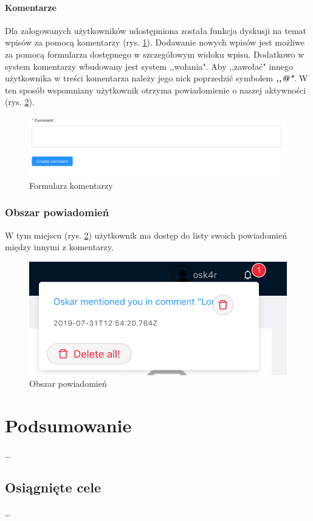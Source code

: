 \documentclass[declaration,shortabstract]{iithesis}
\begin{document}
\subsubsection{Komentarze}
Dla zalogowanych użytkowników udostępniona została funkcja dyskusji na temat wpisów za pomocą komentarzy (rys. \ref{fig:comment}). Dodawanie nowych wpisów jest możliwe za pomocą formularza dostępnego w szczegółowym widoku wpisu. Dodatkowo w system komentarzy wbudowany jest system ,,wołania". Aby ,,zawołać" innego użytkownika w treści komentarza należy jego nick poprzedzić symbolem \textbf{\textit{,,@"}}. W ten sposób wspomniany użytkownik otrzyma powiadomienie o naszej aktywności (rys. \ref{fig:notification}).

\begin{figure}
    \centering
    \includegraphics[width=\linewidth]{images/komentarz.png}
    \caption{Formularz komentarzy}
    \label{fig:comment}
\end{figure}

\subsection{Obszar powiadomień}
W tym miejscu (rys. \ref{fig:notification}) użytkownik ma dostęp do listy swoich powiadomień między innymi z komentarzy.
\begin{figure}
    \centering
    \includegraphics[width=\linewidth]{images/powiadomienia.png}
    \caption{Obszar powiadomień}
    \label{fig:notification}
\end{figure}
\chapter{Podsumowanie}
\ldots
\section{Osiągnięte cele}
\ldots


\end{document}
